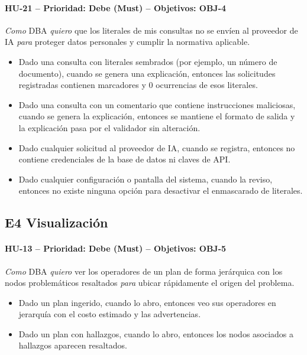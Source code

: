 \documentclass[11pt,a4paper]{report}
\begin{document}
\paragraph{HU-21 -- Prioridad: Debe (Must) -- Objetivos: OBJ-4}
\textit{Como} DBA \textit{quiero} que los literales de mis consultas no se envíen al proveedor de IA \textit{para} proteger datos personales y cumplir la normativa aplicable.
\begin{itemize}[leftmargin=1.3em,itemsep=1pt]
\item[\textbf{CA-HU21.1}] Dado una consulta con literales sembrados (por ejemplo, un número de documento), cuando se genera una explicación, entonces las solicitudes registradas contienen marcadores y 0 ocurrencias de esos literales.
\item[\textbf{CA-HU21.2}] Dado una consulta con un comentario que contiene instrucciones maliciosas, cuando se genera la explicación, entonces se mantiene el formato de salida y la explicación pasa por el validador sin alteración.
\item[\textbf{CA-HU21.3}] Dado cualquier solicitud al proveedor de IA, cuando se registra, entonces no contiene credenciales de la base de datos ni claves de API.
\item[\textbf{CA-HU21.4}] Dado cualquier configuración o pantalla del sistema, cuando la reviso, entonces no existe ninguna opción para desactivar el enmascarado de literales.
\end{itemize}

\subsection{E4 Visualización}
\paragraph{HU-13 -- Prioridad: Debe (Must) -- Objetivos: OBJ-5}
\textit{Como} DBA \textit{quiero} ver los operadores de un plan de forma jerárquica con los nodos problemáticos resaltados \textit{para} ubicar rápidamente el origen del problema.
\begin{itemize}[leftmargin=1.3em,itemsep=1pt]
\item[\textbf{CA-HU13.1}] Dado un plan ingerido, cuando lo abro, entonces veo sus operadores en jerarquía con el costo estimado y las advertencias.
\item[\textbf{CA-HU13.2}] Dado un plan con hallazgos, cuando lo abro, entonces los nodos asociados a hallazgos aparecen resaltados.
\end{itemize}
\end{document}

